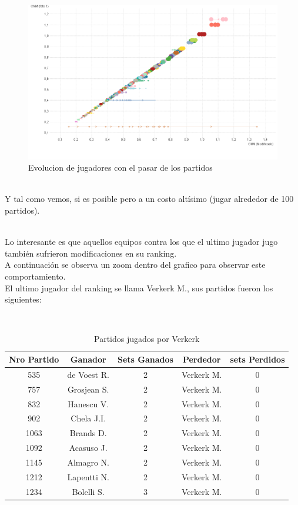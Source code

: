 \begin{figure}[H]
    \centering
    \includegraphics[width=1\textwidth]{IMG/comparativa cmm -cmm foto 100.png}
    \caption{Evolucion de jugadores con el pasar de los partidos}
    \label{fig:Evolucion de jugadores con el pasar de los partidos}
\end{figure}

\\
Y tal como vemos, si es posible pero a un costo altísimo (jugar alrededor de 100 partidos).

\\
Lo interesante es que aquellos equipos contra los que el ultimo jugador jugo también sufrieron modificaciones en su ranking. \\
A continuación se observa un zoom dentro del grafico para observar este comportamiento.
\\

El ultimo jugador del ranking se llama Verkerk M., sus partidos fueron los siguientes:

\\
\begin{table}[H]
    \caption{Partidos jugados por Verkerk}
    \centering
    \begin{tabular}{| c | c | c | c | c |}
        \hline \hline
        Nro Partido & Ganador & Sets Ganados & Perdedor & sets Perdidos \\
        \hline
        535 & de Voest R. & 2 & Verkerk M. & 0 \\
        757 & Grosjean S. & 2 & Verkerk M. & 0 \\
        832 & Hanescu V. & 2 & Verkerk M. & 0 \\
        902 & Chela J.I. & 2 & Verkerk M. & 0 \\
        1063 & Brands D. & 2 & Verkerk M. & 0 \\
        1092 & Acasuso J. & 2 & Verkerk M. & 0 \\
        1145 & Almagro N. & 2 & Verkerk M. & 0 \\
        1212 & Lapentti N. & 2 & Verkerk M. & 0 \\
        1234 & Bolelli S. & 3 & Verkerk M. & 0 \\
        \hline
    \end{tabular}
\end{table}

